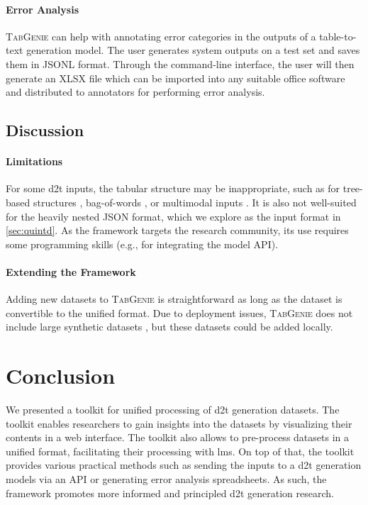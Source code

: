 \paragraph{Error Analysis} \textsc{TabGenie} can help with annotating error categories in the outputs of a table-to-text generation model. The user generates system outputs on a test set and saves them in JSONL format. Through the command-line interface, the user will then generate an XLSX file which can be imported into any suitable office software and distributed to annotators for performing error analysis.

\subsection{Discussion}

\paragraph{Limitations} For some \ac{d2t} inputs, the tabular structure may be inappropriate, such as for tree-based structures \cite{balakrishnan2019constrained}, bag-of-words \cite{lin2019commongen}, or multimodal inputs \cite{krishna2017visual}. It is also not well-suited for the heavily nested JSON format, which we explore as the input format in \autoref{sec:quintd}. As the framework targets the research community, its use requires some programming skills (e.g., for integrating the model API).

\paragraph{Extending the Framework} Adding new datasets to \textsc{TabGenie} is straightforward as long as the dataset is convertible to the unified format. Due to deployment issues, \textsc{TabGenie} does not include large synthetic datasets \cite{agarwalKnowledgeGraphBased2021,jinGenWikiDatasetMillion2020}, but these datasets could be added locally.


\section{Conclusion}
We presented a toolkit for unified processing of \ac{d2t} generation datasets. The toolkit enables researchers to gain insights into the datasets by visualizing their contents in a web interface. The toolkit also allows to pre-process datasets in a unified format, facilitating their processing with \acp{lm}. On top of that, the toolkit provides various practical methods such as sending the inputs to a \ac{d2t} generation models via an API or generating error analysis spreadsheets. As such, the framework promotes more informed and principled \ac{d2t} generation research.